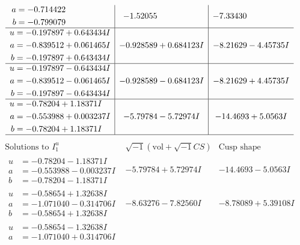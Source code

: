 \documentclass[1p]{elsarticle_modified}
\theoremstyle{definition}
\newcommand{\I}{\sqrt{-1}}
\begin{document}
$$\begin{array}{c|c|c}
\begin{aligned}
a &= -0.714422\phantom{ +0.000000I} \\
b &= -0.799079\phantom{ +0.000000I}\end{aligned}
 & -1.52055\phantom{ +0.000000I} & -7.33430\phantom{ +0.000000I} \\ \hline\begin{aligned}
u &= -0.197897 + 0.643434 I \\
a &= -0.839512 + 0.061465 I \\
b &= -0.197897 + 0.643434 I\end{aligned}
 & -0.928589 + 0.684123 I & -8.21629 - 4.45735 I \\ \hline\begin{aligned}
u &= -0.197897 - 0.643434 I \\
a &= -0.839512 - 0.061465 I \\
b &= -0.197897 - 0.643434 I\end{aligned}
 & -0.928589 - 0.684123 I & -8.21629 + 4.45735 I \\ \hline\begin{aligned}
u &= -0.78204 + 1.18371 I \\
a &= -0.553988 + 0.003237 I \\
b &= -0.78204 + 1.18371 I\end{aligned}
 & -5.79784 - 5.72974 I & -14.4693 + 5.0563 I\\
 \hline 
 \end{array}$$\newpage$$\begin{array}{c|c|c}  
\text{Solutions to }I^u_{1}& \I (\text{vol} + \sqrt{-1}CS) & \text{Cusp shape}\\
 \hline 
\begin{aligned}
u &= -0.78204 - 1.18371 I \\
a &= -0.553988 - 0.003237 I \\
b &= -0.78204 - 1.18371 I\end{aligned}
 & -5.79784 + 5.72974 I & -14.4693 - 5.0563 I \\ \hline\begin{aligned}
u &= -0.58654 + 1.32638 I \\
a &= -1.071040 - 0.314706 I \\
b &= -0.58654 + 1.32638 I\end{aligned}
 & -8.63276 - 7.82560 I & -8.78089 + 5.39108 I \\ \hline\begin{aligned}
u &= -0.58654 - 1.32638 I \\
a &= -1.071040 + 0.314706 I \\

\end{aligned}
\end{array}$$
\end{document}
